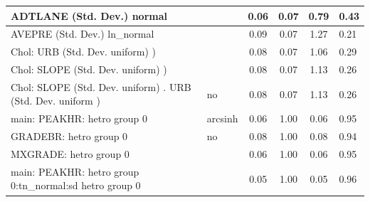 \begin{table}
\begin{center}
\begin{tabular}{|l|l|c|c|c|l|}
			\hline
			ADTLANE (Std. Dev.) normal &  & 0.06 & 0.07 & 0.79 & 0.43 \\
			\hline
			AVEPRE (Std. Dev.) ln_normal &  & 0.09 & 0.07 & 1.27 & 0.21 \\
			\hline
			 Chol: URB (Std. Dev. uniform) ) &  & 0.08 & 0.07 & 1.06 & 0.29 \\
			\hline
			 Chol: SLOPE (Std. Dev. uniform) ) &  & 0.08 & 0.07 & 1.13 & 0.26 \\
			\hline
			 Chol: SLOPE (Std. Dev. uniform) . URB (Std. Dev.   uniform ) & no & 0.08 & 0.07 & 1.13 & 0.26 \\
			\hline
			main: PEAKHR: hetro group 0 & arcsinh & 0.06 & 1.00 & 0.06 & 0.95 \\
			\hline
			GRADEBR: hetro group 0 & no & 0.08 & 1.00 & 0.08 & 0.94 \\
			\hline
			MXGRADE: hetro group 0 &  & 0.06 & 1.00 & 0.06 & 0.95 \\
			\hline
			main: PEAKHR: hetro group 0:tn_normal:sd  hetro group 0 &  & 0.05 & 1.00 & 0.05 & 0.96 \\
			\hline
		\end{tabular}
	\end{center}
\end{table}